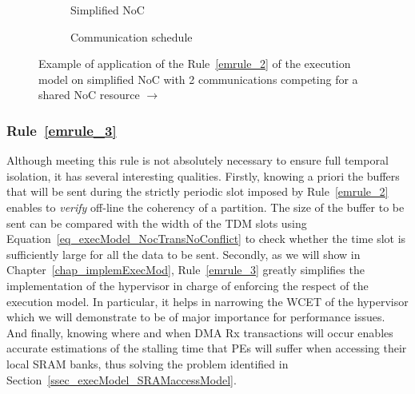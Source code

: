 \documentclass[main.tex]{subfiles}
\begin{document}
\begin{figure}
    \centering
    \begin{subfigure}[b]{0.4\linewidth}
    \centering
        \scalebox{0.7}{}
        \caption{Simplified NoC}
        \label{fig_execModel_exampleRule2_noc}
    \end{subfigure}
    \begin{subfigure}[b]{0.59\linewidth}
    \centering
        
        \caption{Communication schedule}
        \label{fig_execModel_exampleRule2_diagram}
    \end{subfigure}
    \caption{Example of application of the Rule~\ref{emrule_2} of the execution model on simplified NoC with 2 communications competing for a shared NoC resource  $\to$ }
    \label{fig_execModel_exampleRule2}
\end{figure}


\subsubsection{Rule~\ref{emrule_3}}
Although meeting this rule is not absolutely necessary to ensure full temporal isolation, it has several interesting qualities. Firstly, knowing a priori the buffers that will be sent during the strictly periodic slot imposed by Rule~\ref{emrule_2} enables to \emph{verify} off-line the coherency of a partition. The size of the buffer to be sent can be compared with the width of the TDM slots using Equation~\ref{eq_execModel_NocTransNoConflict} to check whether the time slot is sufficiently large for all the data to be sent. Secondly, as we will show in Chapter~\ref{chap_implemExecMod}, Rule~\ref{emrule_3} greatly simplifies the implementation of the hypervisor in charge of enforcing the respect of the execution model. In particular, it helps in narrowing the WCET of the hypervisor which we will demonstrate to be of major importance for performance issues. And finally, knowing where and when DMA Rx transactions will occur enables accurate estimations of the stalling time that PEs will suffer when accessing their local SRAM banks, thus solving the problem identified in Section~\ref{ssec_execModel_SRAMaccessModel}.
\end{document}

